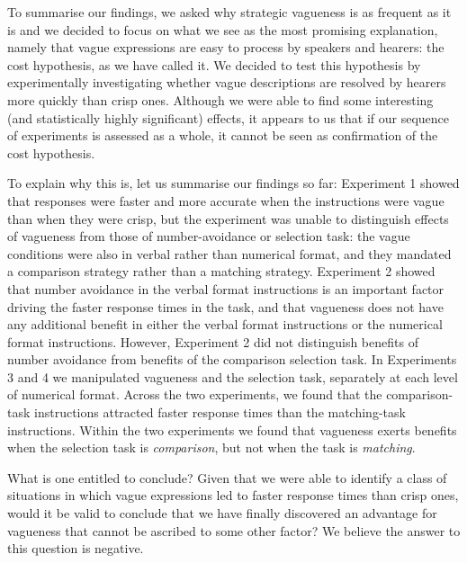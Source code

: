 To summarise our findings, we asked why strategic vagueness is as frequent as it is and we decided to focus on what we see as the most promising explanation, namely that vague expressions are easy to process by speakers and hearers: the cost hypothesis, as we have called it. We decided to test this hypothesis by experimentally investigating whether vague descriptions are resolved by hearers more quickly than crisp ones. Although we were able to find some interesting (and statistically highly significant) effects, it appears to us that if our sequence of experiments is assessed as a whole, it cannot be seen as confirmation of the cost hypothesis.

To explain why this is, let us summarise our findings so far: Experiment 1 showed that responses were faster and more accurate when the instructions were vague than when they were crisp, but the experiment was unable to distinguish effects of vagueness from those of number-avoidance or selection task: the vague conditions were also in verbal rather than numerical format, and they mandated a comparison strategy rather than a matching strategy. Experiment 2 showed that number avoidance in the verbal format instructions is an important factor driving the faster response times in the task, and that vagueness does not have any additional benefit in either the verbal format instructions or the numerical format instructions. However, Experiment 2 did not distinguish benefits of number avoidance from benefits of the comparison selection task. In Experiments 3 and 4 we manipulated vagueness and the selection task, separately at each level of numerical format. Across the two experiments, we found that the comparison-task instructions attracted faster response times than the matching-task instructions. Within the two experiments we found that vagueness exerts benefits when the selection task is \emph{comparison}, but not when the task is \emph{matching}.

What is one entitled to conclude? Given that we were able to identify a class of situations in which vague expressions led to faster response times than crisp ones, would it be valid to conclude that we have finally discovered an advantage for vagueness that cannot be ascribed to some other factor? We believe the answer to this question is negative.

